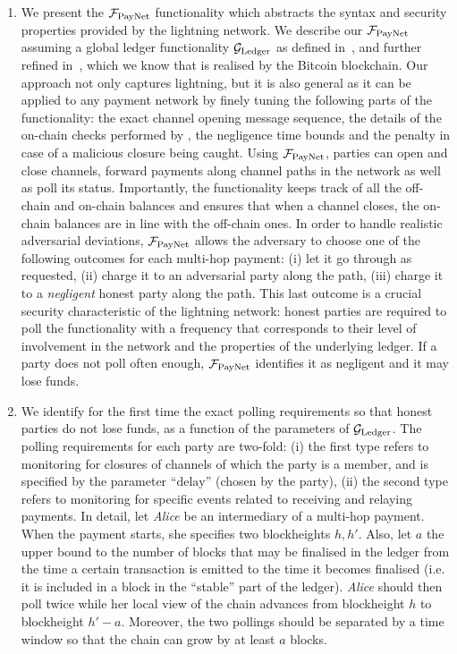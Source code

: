 \begin{enumerate}
\item We present the $\mathcal{F}_{\mathrm{PayNet}}{}$ functionality which abstracts the syntax and
security properties provided by the lightning network. We describe our
$\mathcal{F}_{\mathrm{PayNet}}{}$ assuming a global ledger functionality $\mathcal{G}_{\mathrm{Ledger}}$ as defined
in~\cite{BMTZ17}, and further refined in~\cite{genesis}, which we know that is
realised by the Bitcoin blockchain. Our approach not only captures lightning,
but it is also general as it can be applied to any payment network by finely
tuning the following parts of the functionality: the exact channel opening
message sequence, the details of the on-chain checks performed by \fpaynet, the
negligence time bounds and the penalty in case of a malicious closure being
caught. Using $\mathcal{F}_{\mathrm{PayNet}}{}$, parties can open and close channels, forward
payments along channel paths in the network as well as poll its status.
Importantly, the functionality keeps track of all the off-chain and on-chain
balances and ensures that when a channel closes, the on-chain balances are in
line with the off-chain ones. In order to handle realistic adversarial
deviations, $\mathcal{F}_{\mathrm{PayNet}}{}$ allows the adversary to choose one of the following
outcomes for each multi-hop payment: (i) let it go through as requested, (ii)
charge it to an adversarial party along the path, (iii) charge it to a
\emph{negligent} honest party along the path. This last outcome is a crucial
security characteristic of the lightning network: honest parties are required to
poll the functionality with a frequency that corresponds to their level of
involvement in the network and the properties of the underlying ledger. If a
party does not poll often enough, $\mathcal{F}_{\mathrm{PayNet}}{}$ identifies it as negligent and it
may lose funds.

\item We identify for the first time the exact polling requirements so that
honest parties do not lose funds, as a function of the parameters of $\mathcal{G}_{\mathrm{Ledger}}$.
The polling requirements for each party are two-fold: (i) the first type refers
to monitoring for closures of channels of which the party is a member, and is
specified by the parameter ``$\mathrm{delay}$'' (chosen by the party), (ii) the
second type refers to monitoring for specific events related to receiving and
relaying payments. In detail, let \emph{Alice} be an intermediary of a multi-hop
payment. When the payment starts, she specifies two blockheights $h, h'$. Also,
let $a$ the upper bound to the number of blocks that may be finalised in the
ledger from the time a certain transaction is emitted to the time it becomes
finalised (i.e. it is included in a block in the ``stable'' part of the ledger).
\emph{Alice} should then poll twice while her local view of the chain advances
from blockheight $h$ to blockheight $h' - a$. Moreover, the two pollings should
be separated by a time window so that the chain can grow by at least $a$ blocks.


\end{enumerate}
